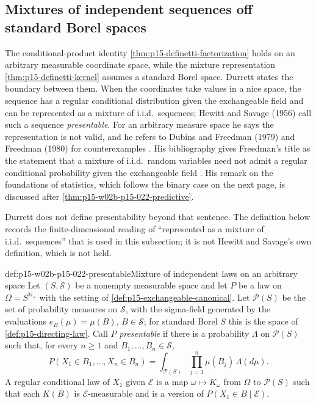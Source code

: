 \subsection{Mixtures of independent sequences off standard Borel spaces}
\label{sec:p15-w02b-p15-022-presentable}

The conditional-product identity \cref{thm:p15-definetti-factorization}
holds on an arbitrary measurable coordinate space, while the mixture
representation \cref{thm:p15-definetti-kernel} assumes a standard Borel
space. Durrett states the boundary between them. When the coordinates take
values in a nice space, the sequence has a regular conditional distribution
given the exchangeable field and can be represented as a mixture of
i.i.d.\ sequences; Hewitt and Savage (1956) call such a sequence
\emph{presentable}. For an arbitrary measure space he says the
representation is not valid, and he refers to Dubins and Freedman (1979) and
Freedman (1980) for counterexamples \cite[p.~254]{DurrettPTEAuthor2019}.
His bibliography gives Freedman's title as the statement that a mixture of
i.i.d.\ random variables need not admit a regular conditional probability
given the exchangeable field \cite[p.~478]{DurrettPTEAuthor2019}.
His remark on the foundations of statistics, which follows the binary
case on the next page, is discussed after
\cref{thm:p15-w02b-p15-022-predictive}.

Durrett does not define presentability beyond that sentence. The
definition below records the finite-dimensional reading of ``represented
as a mixture of i.i.d.\ sequences'' that is used in this subsection; it is
not Hewitt and Savage's own definition, which is not held.

\begin{hbdefinition}{def:p15-w02b-p15-022-presentable}{Mixture of independent laws on an arbitrary space}
Let \((S,\mathcal S)\) be a nonempty measurable space and let \(P\) be a
law on \(\Omega=S^{\mathbb N_+}\) with the setting of
\cref{def:p15-exchangeable-canonical}. Let \(\mathscr P(S)\) be the set of
probability measures on \(\mathcal S\), with the sigma-field generated by
the evaluations \(e_B(\mu)=\mu(B)\), \(B\in\mathcal S\); for standard Borel
\(S\) this is the space of \cref{def:p15-directing-law}. Call \(P\)
\emph{presentable} if there is a probability \(\Lambda\) on
\(\mathscr P(S)\) such that, for every \(n\geq1\) and
\(B_1,\ldots,B_n\in\mathcal S\),
\[
 P(X_1\in B_1,\ldots,X_n\in B_n)
            =\int_{\mathscr P(S)}\prod_{j=1}^n\mu(B_j)\,\Lambda(d\mu).
\]
A regular conditional law of \(X_1\) given \(\mathcal E\) is a map
\(\omega\mapsto K_\omega\) from \(\Omega\) to \(\mathscr P(S)\) such that
each \(K(B)\) is \(\mathcal E\)-measurable and is a version of
\(P(X_1\in B\mid\mathcal E)\).
\end{hbdefinition}

